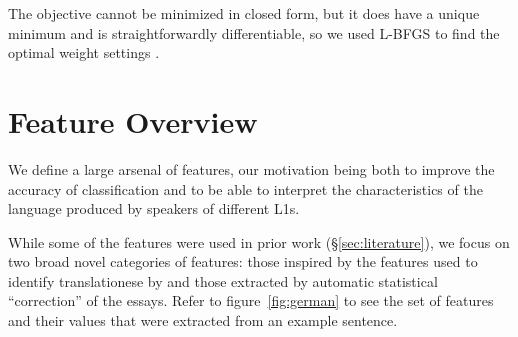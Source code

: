 \documentclass[11pt,letterpaper]{article}
\newcommand{\Sref}[1]{\S\ref{#1}}
\newcommand{\fref}[1]{figure~\ref{#1}}
\begin{document}
The objective cannot be minimized in closed form, but it does have a unique minimum and is straightforwardly differentiable, so we used L-BFGS to find the optimal weight settings \citep{lbfgs}.

\section{Feature Overview}
\label{sec:features}
We define a large arsenal of features, our motivation being both to
improve the accuracy of classification and to be able to interpret the
characteristics of the language produced by speakers of different
L1s.

While some of the features were used in prior work (\Sref{sec:literature}), we focus on two broad novel categories of features: those inspired by the
features used to identify translationese by \citet{vered:noam:shuly} and those extracted by automatic statistical ``correction'' of the essays. Refer to \fref{fig:german} to see the set of features and their values that were extracted from an example sentence.
\end{document}
